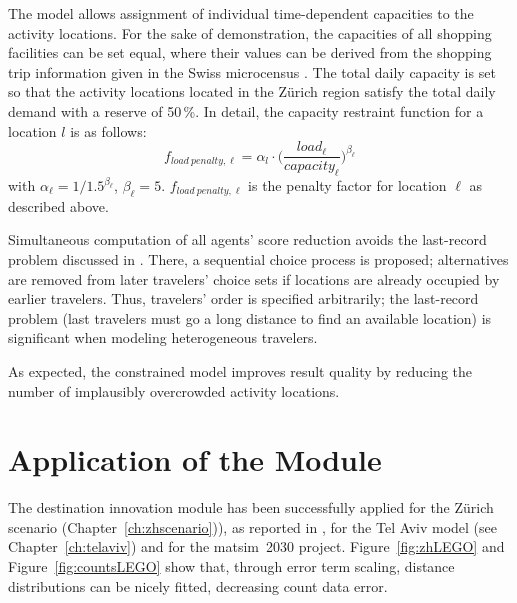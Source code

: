 The model allows assignment of individual time-dependent capacities to the activity locations. For the sake of demonstration, the capacities of all shopping facilities can be set equal, where their values can be derived from the shopping trip information given in the
Swiss microcensus \citep[][]{BfS-MZ2005_manual_2006}. 
The total daily capacity is set so that the activity locations located in the Zürich  region satisfy the total daily demand with a reserve of 50\,\%. In detail, the capacity restraint function for a location $l$ is as follows:
\[
f_{load\ penalty, \ell}=\alpha_l \cdot \Bigg(\frac{load_{\ell}}{capacity_{\ell}}\Bigg)^{\beta_\ell}
\]
with $\alpha_\ell=1/1.5^{\beta_\ell}$, $\beta_\ell=5$. $f_{load\ penalty, \ell}$ is the penalty factor for location $\ell$ as described above.

Simultaneous computation of all agents' score reduction avoids the last-record problem discussed in \citet[][]{VovshaEtAl_TRR_2002}. 
There, a sequential choice process is proposed; alternatives are removed from later travelers' choice sets if locations are already occupied by earlier travelers. 
Thus, travelers' order is specified arbitrarily; the last-record problem (last travelers must go a long distance to find an available location) is significant when modeling heterogeneous travelers. 

As expected, the constrained model improves result quality by reducing the number of implausibly overcrowded activity locations.

\section{Application of the Module}
The destination innovation module has been successfully applied for the Zürich scenario (Chapter~\ref{ch:zhscenario})), as reported in \citet[][p.99]{Horni_PhDThesis_2013}, for the Tel Aviv model (see Chapter~\ref{ch:telaviv}) and for the \gls{matsim}~2030 project. 
Figure~\ref{fig:zhLEGO} and Figure~\ref{fig:countsLEGO} show that, through error term scaling, distance distributions can be nicely fitted, decreasing count data error.

